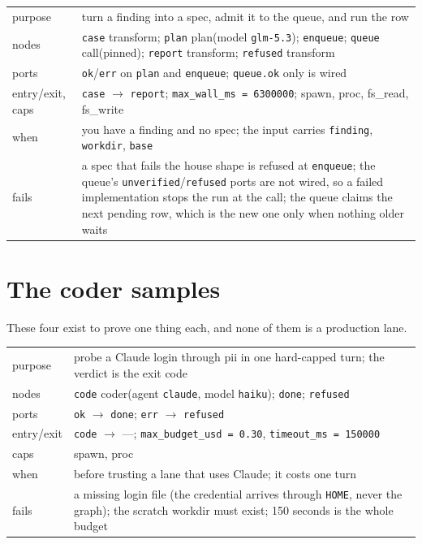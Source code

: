\begin{center}\footnotesize
\begin{tabular}{@{}>{\raggedright\arraybackslash}p{}>{\raggedright\arraybackslash}p{}@{}}
  purpose & turn a finding into a spec, admit it to the queue, and run the row \\
  nodes & \texttt{case} transform; \texttt{plan} plan(model \texttt{glm-5.3});
    \texttt{enqueue}; \texttt{queue} call(pinned); \texttt{report} transform;
    \texttt{refused} transform \\
  ports & \texttt{ok}/\texttt{err} on \texttt{plan} and \texttt{enqueue};
    \texttt{queue.ok} only is wired \\
  entry/exit, caps & \texttt{case} $\to$ \texttt{report}; \texttt{max\_wall\_ms = 6300000}; spawn, proc, fs\_read, fs\_write \\
  when & you have a finding and no spec; the input carries \texttt{finding},
    \texttt{workdir}, \texttt{base} \\
  fails & a spec that fails the house shape is refused at \texttt{enqueue}; the queue's
    \texttt{unverified}/\texttt{refused} ports are not wired, so a failed implementation
    stops the run at the call; the queue claims the next pending row, which is the new one
    only when nothing older waits \\
\end{tabular}
\end{center}

\section{The coder samples}

These four exist to prove one thing each, and none of them is a production lane.

\begin{center}\footnotesize
\begin{tabular}{@{}>{\raggedright\arraybackslash}p{}>{\raggedright\arraybackslash}p{}@{}}
  purpose & probe a Claude login through pii in one hard-capped turn; the verdict is the exit
    code \\
  nodes & \texttt{code} coder(agent \texttt{claude}, model \texttt{haiku});
    \texttt{done}; \texttt{refused} \\
  ports & \texttt{ok} $\to$ \texttt{done}; \texttt{err} $\to$ \texttt{refused} \\
  entry/exit & \texttt{code} $\to$ ---; \texttt{max\_budget\_usd = 0.30},
    \texttt{timeout\_ms = 150000} \\
  caps & spawn, proc \\
  when & before trusting a lane that uses Claude; it costs one turn \\
  fails & a missing login file (the credential arrives through \texttt{HOME}, never the
    graph); the scratch workdir must exist; 150 seconds is the whole budget \\
\end{tabular}
\end{center}

